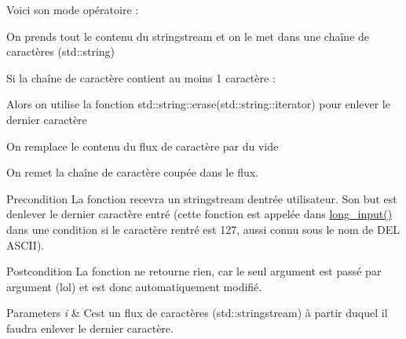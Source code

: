 Voici son mode opératoire \+:
\begin{DoxyEnumerate}
\item On prends tout le contenu du stringstream et on le met dans une chaîne de caractères (std\+::string)
\item Si la chaîne de caractère contient au moins 1 caractère \+:
\begin{DoxyEnumerate}
\item Alors on utilise la fonction std\+::string\+::erase(std\+::string\+::iterator) pour enlever le dernier caractère
\item On remplace le contenu du flux de caractère par du vide
\item On remet la chaîne de caractère coupée dans le flux.
\end{DoxyEnumerate}
\end{DoxyEnumerate}

\begin{DoxyPrecond}{Precondition}
La fonction recevra un stringstream d\textquotesingle{}entrée utilisateur. Son but est d\textquotesingle{}enlever le dernier caractère entré (cette fonction est appelée dans \hyperlink{namespaceio_ab044be3afd7ac04eeb1a496af0f1d5c6}{long\+\_\+input()} dans une condition si le caractère rentré est 127, aussi connu sous le nom de D\+EL A\+S\+C\+II). 
\end{DoxyPrecond}
\begin{DoxyPostcond}{Postcondition}
La fonction ne retourne rien, car le seul argument est passé par argument (lol) et est donc automatiquement modifié. 
\end{DoxyPostcond}

\begin{DoxyParams}{Parameters}
{\em i} & C\textquotesingle{}est un flux de caractères (std\+::stringstream) à partir duquel il faudra enlever le dernier caractère. \\
\hline
\end{DoxyParams}
